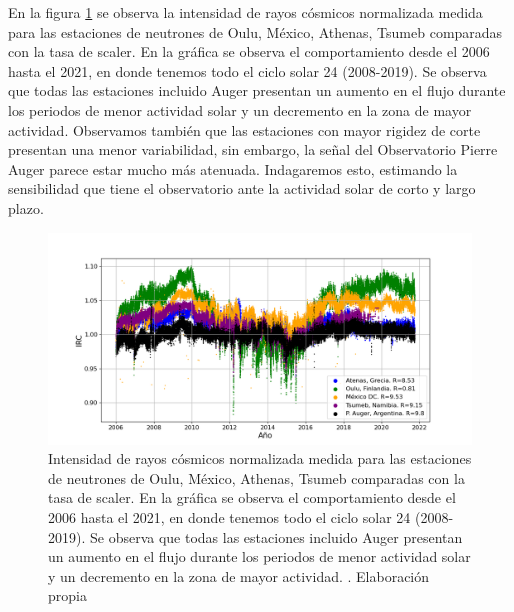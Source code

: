 En la figura \ref{NM_compar} se observa la intensidad de rayos cósmicos normalizada medida para las estaciones de neutrones de Oulu, México, Athenas, Tsumeb comparadas con la tasa de scaler. En la gráfica se observa el comportamiento desde el 2006 hasta el 2021, en donde tenemos todo el ciclo solar 24 (2008-2019). Se observa que todas las estaciones incluido Auger presentan un aumento en el flujo durante los periodos de menor actividad solar y un decremento en la zona de mayor actividad. Observamos también que las estaciones con mayor rigidez de corte presentan una menor variabilidad, sin embargo, la señal del Observatorio Pierre Auger parece estar mucho más atenuada. Indagaremos esto, estimando la sensibilidad que tiene el observatorio ante la actividad solar de corto y largo plazo.
\begin{figure}
\centering
    \includegraphics[width=1.1\linewidth]{Figs/Figr/NM_Auger_comparison.png}
    \caption[Diagrama esquemático del monitor de neutrones 6-NM64 ubicado en Atenas, Grecia.]{Intensidad de rayos cósmicos normalizada medida para las estaciones de neutrones de Oulu, México, Athenas, Tsumeb comparadas con la tasa de scaler. En la gráfica se observa el comportamiento desde el 2006 hasta el 2021, en donde tenemos todo el ciclo solar 24 (2008-2019). Se observa que todas las estaciones incluido Auger presentan un aumento en el flujo durante los periodos de menor actividad solar y un decremento en la zona de mayor actividad.  . Elaboración propia}
    \label{NM_compar}
\end{figure}

